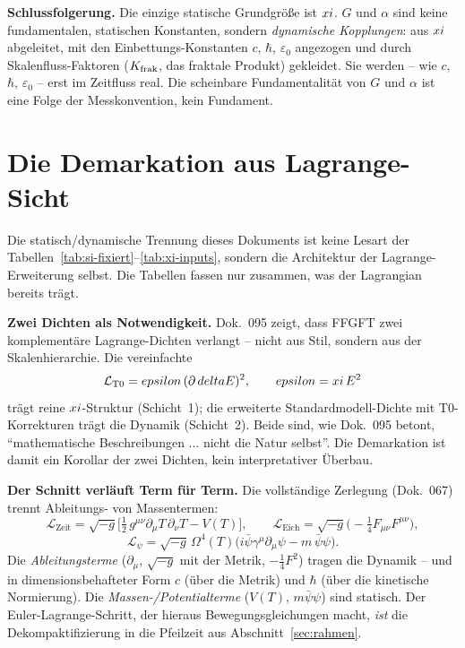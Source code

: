 \begin{schlussfolgerung}
\textbf{Schlussfolgerung.} Die einzige statische Grundgröße ist $xi$. $G$ und
$\alpha$ sind keine fundamentalen, statischen Konstanten, sondern \emph{dynamische
Kopplungen}: aus $xi$ abgeleitet, mit den Einbettungs-Konstanten $c$, $\hbar$,
$\varepsilon_0$ angezogen und durch Skalenfluss-Faktoren ($K_{\text{frak}}$, das fraktale
Produkt) gekleidet. Sie werden -- wie $c$, $\hbar$, $\varepsilon_0$ -- erst im
Zeitfluss real. Die scheinbare Fundamentalität von $G$ und $\alpha$ ist eine Folge
der Messkonvention, kein Fundament.
\end{schlussfolgerung}

\section{Die Demarkation aus Lagrange-Sicht}

Die statisch/dynamische Trennung dieses Dokuments ist keine Lesart der
Tabellen~\ref{tab:si-fixiert}--\ref{tab:xi-inputs}, sondern die Architektur der
Lagrange-Erweiterung selbst. Die Tabellen fassen nur zusammen, was der Lagrangian
bereits trägt.

\textbf{Zwei Dichten als Notwendigkeit.} Dok.~095 zeigt, dass FFGFT zwei
komplementäre Lagrange-Dichten verlangt -- nicht aus Stil, sondern aus der
Skalenhierarchie. Die vereinfachte
\[
  \mathcal{L}_{\mathrm{T0}} = epsilon\,(\partial\,delta E)^2,
  \qquad epsilon = xi\,E^2
\]
trägt reine $xi$-Struktur (Schicht~1); die erweiterte Standardmodell-Dichte mit
T0-Korrekturen trägt die Dynamik (Schicht~2). Beide sind, wie Dok.~095 betont,
``mathematische Beschreibungen ... nicht die Natur selbst''. Die Demarkation ist
damit ein Korollar der zwei Dichten, kein interpretativer Überbau.

\textbf{Der Schnitt verläuft Term für Term.} Die vollständige Zerlegung (Dok.~067)
trennt Ableitungs- von Massentermen:
\[
  \mathcal{L}_{\text{Zeit}} = \sqrt{-g}\Big[\tfrac{1}{2}\,g^{\mu\nu}\partial_\mu T\,\partial_\nu T - V(T)\Big],
  \qquad
  \mathcal{L}_{\text{Eich}} = \sqrt{-g}\big(-\tfrac{1}{4}F_{\mu\nu}F^{\mu\nu}\big),
\]
\[
  \mathcal{L}_\psi = \sqrt{-g}\,\Omega^4(T)\big(i\bar\psi\gamma^\mu\partial_\mu\psi - m\,\bar\psi\psi\big).
\]
Die \emph{Ableitungsterme} ($\partial_\mu$, $\sqrt{-g}$ mit der Metrik,
$-\tfrac14 F^2$) tragen die Dynamik -- und in dimensionsbehafteter Form $c$ (über
die Metrik) und $\hbar$ (über die kinetische Normierung). Die
\emph{Massen-/Potentialterme} ($V(T)$, $m\bar\psi\psi$) sind statisch. Der
Euler-Lagrange-Schritt, der hieraus Bewegungsgleichungen macht, \emph{ist} die
Dekompaktifizierung in die Pfeilzeit aus Abschnitt~\ref{sec:rahmen}.

